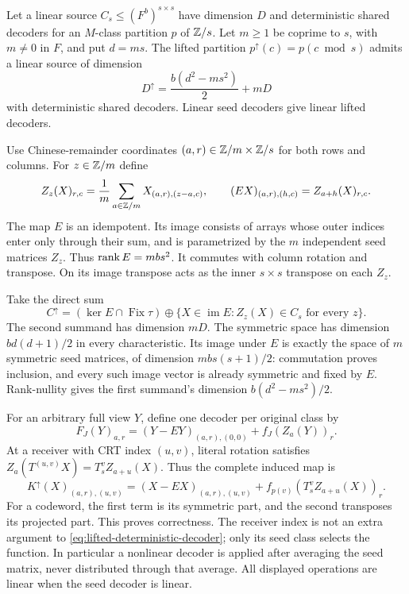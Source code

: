 \begin{theorem}\label{thm:cyclic-lift}
Let a linear source $C_s\le(F^b)^{s\times s}$ have dimension $D$ and
deterministic shared decoders for an $M$-class partition $p$ of $\mathbb{Z}/s$.
Let $m\ge1$ be coprime to $s$, with $m\ne0$ in $F$, and put $d=ms$.
The lifted partition $p^\uparrow(c)=p(c\bmod s)$ admits a linear source
of dimension
\begin{equation}\label{eq:cyclic-lift-dimension}
 D^\uparrow=\frac{b(d^2-ms^2)}2+mD
\end{equation}
with deterministic shared decoders. Linear seed decoders give linear
lifted decoders.
\end{theorem}
\begin{outline}
Use Chinese-remainder coordinates $(a,r)\in\mathbb{Z}/m\times\mathbb{Z}/s$ for both
rows and columns. For $z\in\mathbb{Z}/m$ define
\[
 Z_z(X)_{r,c}=\frac1m\sum_{a\in\mathbb{Z}/m}X_{(a,r),(z-a,c)},\qquad
 (EX)_{(a,r),(h,c)}=Z_{a+h}(X)_{r,c}.
\]
The map $E$ is an idempotent. Its image consists of arrays whose outer
indices enter only through their sum, and is parametrized by the $m$
independent seed matrices $Z_z$. Thus $\operatorname{rank} E=mbs^2$.
It commutes with column rotation and transpose. On its image transpose
acts as the inner $s\times s$ transpose on each $Z_z$.

Take the direct sum
\[
 C^\uparrow=(\ker E\cap\operatorname{Fix}\tau)\oplus
 \{X\in\operatorname{im}E:Z_z(X)\in C_s\text{ for every }z\}.
\]
The second summand has dimension $mD$. The symmetric space has dimension
$bd(d+1)/2$ in every characteristic. Its image under $E$ is exactly the
space of $m$ symmetric seed matrices, of dimension $mbs(s+1)/2$:
commutation proves inclusion, and every such image vector is already
symmetric and fixed by $E$. Rank-nullity gives the first summand's
dimension $b(d^2-ms^2)/2$.

For an arbitrary full view $Y$, define one decoder per original class by
\begin{equation}\label{eq:lifted-deterministic-decoder}
 F_J(Y)_{a,r}=(Y-EY)_{(a,r),(0,0)}+f_J(Z_a(Y))_r.
\end{equation}
At a receiver with CRT index $(u,v)$, literal rotation satisfies
$Z_a(T^{(u,v)}X)=T_s^vZ_{a+u}(X)$. Thus the complete induced map is
\[
 K^\uparrow(X)_{(a,r),(u,v)}
 =(X-EX)_{(a,r),(u,v)}+f_{p(v)}(T_s^vZ_{a+u}(X))_r.
\]
For a codeword, the first term is its symmetric part, and the second
transposes its projected part. This proves correctness. The receiver
index is not an extra argument to \eqref{eq:lifted-deterministic-decoder};
only its seed class selects the function. In particular a nonlinear
decoder is applied after averaging the seed matrix, never distributed
through that average. All displayed operations are linear when the
seed decoder is linear.
\end{outline}

